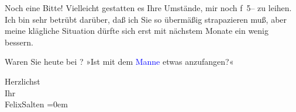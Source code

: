 \pstart
           Noch eine Bitte! Vielleicht gestatten es Ihre Umstände, mir noch f 5– zu leihen. Ich
               bin sehr {\pb}betrübt darüber,
               daß ich Sie so übermäßig strapazieren muß, aber meine klägliche Situation dürfte sich
               erst mit nächstem Monate ein wenig bessern.\pend
           
\pstart
           Waren Sie heute bei \label{K_L03109-6v}\label{K_L03109-6h}? »Ist mit dem \textcolor{blue}{Manne}{}\ledrightnote{{$\rightarrow$}\textcolor{blue}{Leopold Weiss}} etwas anzufangen?«\pend
           
\pstart
           Herzlichst{\\[\baselineskip]}Ihr{\\[\baselineskip]}\spacefill\mbox{FelixSalten}\pend
           \leftskip=0em{}\endnumbering{}  
      